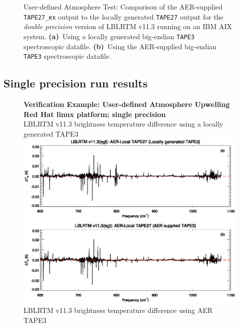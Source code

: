 \begin{figure}[htp]
  \caption{User-defined Atmosphere Test: Comparison of the AER-supplied \texttt{TAPE27\_ex} output to the locally generated \texttt{TAPE27} output for the \textsl{double precision} version of LBLRTM v11.3 running on an IBM AIX system. \mbox{\textbf{(a)} Using} a locally generated big-endian \texttt{TAPE3} spectroscopic datafile. \mbox{\textbf{(b)} Using} the AER-supplied big-endian \texttt{TAPE3} spectroscopic datafile.}
  \label{fig:run_example_user_defined_upwelling-dbl_ibm}
\end{figure}


\subsection{Single precision run results}

\begin{figure}[htp]
  \centering
  \qquad\sffamily\textbf{Verification Example: User-defined Atmosphere Upwelling}\\
  \qquad\sffamily\textbf{Red Hat linux platform; single precision}\\
  \qquad\textsf{LBLRTM v11.3 brightness temperature difference using a locally generated TAPE3}\\
  \includegraphics[bb=85 403 534 558,clip,scale=1.0]{graphics/run_example_user_defined_upwelling/sgl.eps}
  \qquad\textsf{LBLRTM v11.3 brightness temperature difference using AER TAPE3}\\

\end{figure}
